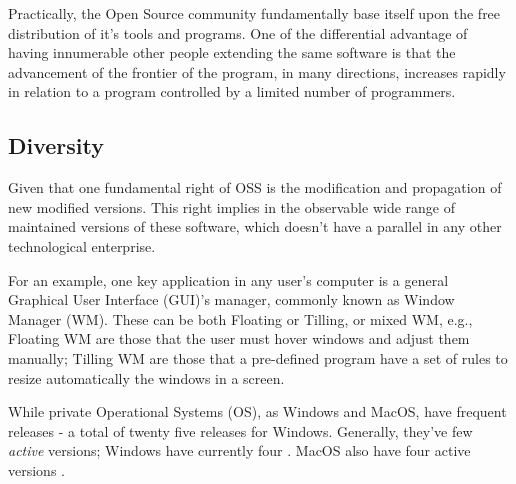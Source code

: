 \documentclass[
12pt,				%
openright,			%
oneside,			%
a4paper,			%
brazil,				%
english,			%
]{abntex2}
\begin{document}
Practically, the Open Source community fundamentally base itself upon
the free distribution of it's tools and programs. One of the differential
advantage of having innumerable other people extending the same
software is that the advancement of the frontier of the program, in
many directions, increases rapidly in relation to a program controlled
by a limited number of programmers.


\subsection{Diversity}
\label{sec:diversity}

Given that one fundamental right of OSS is the modification and
propagation of new modified versions. This right implies in the
observable wide range of maintained versions of these software, which
doesn't have a parallel in any other technological enterprise. 

For an example, one key application in any user's computer is a general
Graphical User Interface (GUI)'s manager, commonly known as Window
Manager (WM). These can be both Floating or Tilling, or mixed WM,
e.g., Floating WM are those that the user must hover windows and
adjust them manually; Tilling WM are those that a pre-defined program
have a set of rules to resize automatically the windows in a screen.


While private Operational Systems (OS), as Windows and MacOS, have
frequent releases - a total of twenty five releases for
Windows. Generally, they've few \textit{active} versions; Windows have
currently four \cite{wikipedia_2021W}. MacOS also have four active
versions \cite{wikipedia_2021Mac}.
\end{document}
